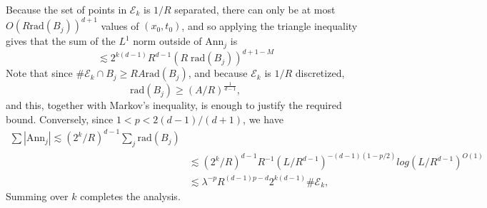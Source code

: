 %
Because the set of points in $\mathcal{E}_k$ is $1/R$ separated, there can only be at most $O(R \text{rad}(B_j))^{d+1}$ values of $(x_0,t_0)$, and so applying the triangle inequality gives that the sum of the $L^1$ norm outside of $\text{Ann}_j$ is
%
\[ \lesssim 2^{k(d-1)}R^{d-1} ( R\; \text{rad}(B_j) )^{d+1-M} \]
%
Note that since $\# \mathcal{E}_k \cap B_j \geq R A \text{rad}(B_j)$, and because $\mathcal{E}_k$ is $1/R$ discretized,
%
\[ \text{rad}(B_j) \geq (A / R)^{\frac{1}{d-1}}, \]
%
and this, together with Markov's inequality, is enough to justify the required bound. Conversely, since $1 < p < 2(d-1)/(d+1)$, we have
%
\begin{align*}
    \sum |\text{Ann}_j| \lesssim (2^k / R)^{d-1} \sum_j \text{rad}(B_j)\\
    &\lesssim (2^k / R)^{d-1} R^{-1} (L / R^{d-1} )^{-(d-1)(1 - p/2)} log(L / R^{d-1})^{O(1)}\\
    &\lesssim \lambda^{-p} R^{(d-1)p - d} 2^{k(d-1)} \# \mathcal{E}_k,
\end{align*}
%
Summing over $k$ completes the analysis.

%
%
%
%
%
%
%
%
%
%


